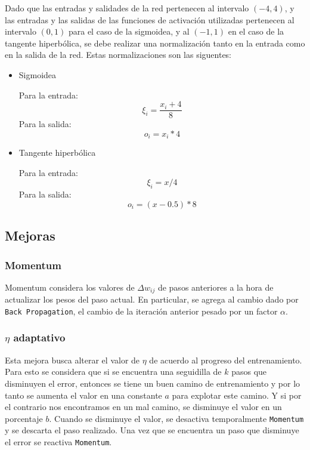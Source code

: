\documentclass[a4paper,10pt]{article}
\begin{document}
        Dado que las entradas y salidades de la red pertenecen al intervalo $(-4, 4)$, y las entradas y las salidas de las funciones de activación utilizadas 
        pertenecen al intervalo $(0,1)$ para el caso de la sigmoidea, y al $(-1,1)$ en el caso de la tangente hiperbólica, se debe realizar una normalización 
        tanto en la entrada como en la salida de la red. Estas normalizaciones son las siguentes:

        \begin{itemize}
            \item Sigmoidea

                Para la entrada: \[ \xi_{i} = \frac{x_{i} + 4}{8} \]
                Para la salida: \[ o_{i} = x_{i} * 4 \]
            \item Tangente hiperbólica

                Para la entrada: \[ \xi_{i} = x / 4 \]
                Para la salida: \[ o_{i} = (x - 0.5) * 8 \]
        \end{itemize}


    \subsection{Mejoras}

        \subsubsection{Momentum}

        Momentum considera los valores de $\Delta w_{ij}$ de pasos anteriores a la hora de actualizar los pesos del paso actual.
        En particular, se agrega al cambio dado por \texttt{Back Propagation}, el cambio de la iteración anterior pesado por un factor $\alpha$.

        \subsubsection{$\eta$ adaptativo}

        Esta mejora busca alterar el valor de $\eta$ de acuerdo al progreso del entrenamiento.
        Para esto se considera que si se encuentra una seguidilla de $k$ pasos que disminuyen el error, entonces se tiene un buen camino de entrenamiento y por lo tanto se aumenta 
        el valor en una constante $a$ para explotar este camino. Y si por el contrario nos encontramos en un mal camino, se disminuye el valor en un porcentaje $b$.
        Cuando se disminuye el valor, se desactiva temporalmente \texttt{Momentum} y se descarta el paso realizado.
        Una vez que se encuentra un paso que disminuye el error se reactiva \texttt{Momentum}.
\end{document}
